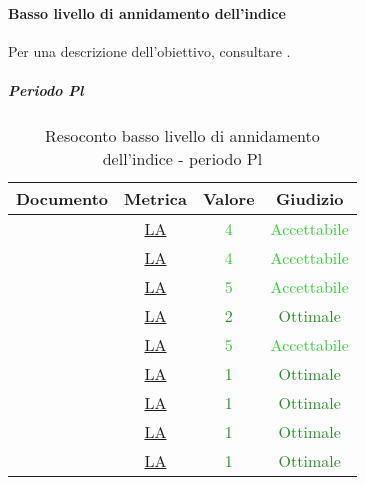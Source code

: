					\paragraph{Basso livello di annidamento dell'indice}
						Per una descrizione dell'obiettivo, consultare .
						\subparagraph{Periodo Pl}
						\begin{table}[H]
							\centering
							\small
							\begin{tabular}{c | c | c | c}
								\hline
								\textbf{Documento} & \textbf{Metrica} & \textbf{Valore} & \textbf{Giudizio} \\
								\hline
								\pdpvdue        & \hyperref[MLEC]{LA} & \textcolor{LimeGreen}{4} & \textcolor{LimeGreen}{Accettabile} \\
								\pdqvdue        & \hyperref[MLEC]{LA} & \textcolor{LimeGreen}{4} & \textcolor{LimeGreen}{Accettabile} \\
								\ndpvdue        & \hyperref[MLEC]{LA} & \textcolor{LimeGreen}{5} & \textcolor{LimeGreen}{Accettabile} \\
								\adrvdue        & \hyperref[MLEC]{LA}& \textcolor{ForestGreen}{2} & \textcolor{ForestGreen}{Ottimale} \\
								\stvuno		& \hyperref[MLEC]{LA} & \textcolor{LimeGreen}{5} & \textcolor{LimeGreen}{Accettabile} \\
								\glvdue        & \hyperref[MLEC]{LA} & \textcolor{ForestGreen}{1} & \textcolor{ForestGreen}{Ottimale} \\
								\vcinquei       &\hyperref[MLEC]{LA} & \textcolor{ForestGreen}{1} & \textcolor{ForestGreen}{Ottimale} \\
								\vseii       & \hyperref[MLEC]{LA} & \textcolor{ForestGreen}{1} & \textcolor{ForestGreen}{Ottimale} \\
								\vtree       & \hyperref[MLEC]{LA} & \textcolor{ForestGreen}{1} & \textcolor{ForestGreen}{Ottimale} \\
								\hline
							\end{tabular}
							\caption{Resoconto basso livello di annidamento dell'indice - periodo Pl}
							\label{tab_resoconto_basso_livello_di_annidamento_indice_PPL}
						\end{table}
						
